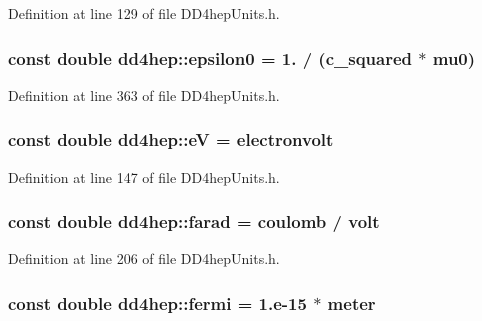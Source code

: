 Definition at line 129 of file DD4hepUnits.h.\hypertarget{namespacedd4hep_a7838df71bb4bd46b01798c559daadc4b}{
\subsubsection[{epsilon0}]{\setlength{\rightskip}{0pt plus 5cm}const double {\bf dd4hep::epsilon0} = 1. / ({\bf c\_\-squared} $\ast$ {\bf mu0})}}
\label{namespacedd4hep_a7838df71bb4bd46b01798c559daadc4b}


Definition at line 363 of file DD4hepUnits.h.\hypertarget{namespacedd4hep_a17b06ecf4141c435b68b9873d0474460}{
\subsubsection[{eV}]{\setlength{\rightskip}{0pt plus 5cm}const double {\bf dd4hep::eV} = {\bf electronvolt}}}
\label{namespacedd4hep_a17b06ecf4141c435b68b9873d0474460}


Definition at line 147 of file DD4hepUnits.h.\hypertarget{namespacedd4hep_a520a532361cb9086c6d4c69ac195ddba}{
\subsubsection[{farad}]{\setlength{\rightskip}{0pt plus 5cm}const double {\bf dd4hep::farad} = {\bf coulomb} / {\bf volt}}}
\label{namespacedd4hep_a520a532361cb9086c6d4c69ac195ddba}


Definition at line 206 of file DD4hepUnits.h.\hypertarget{namespacedd4hep_ab70812b84cbdb9ab6090547c4b237abb}{
\subsubsection[{fermi}]{\setlength{\rightskip}{0pt plus 5cm}const double {\bf dd4hep::fermi} = 1.e-\/15 $\ast$ {\bf meter}}}
\label{namespacedd4hep_ab70812b84cbdb9ab6090547c4b237abb}


